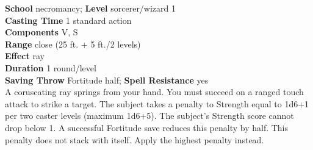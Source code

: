 \textbf{School} necromancy; \textbf{Level} sorcerer/wizard 1\\
\textbf{Casting Time} 1 standard action\\
\textbf{Components} V, S\\
\textbf{Range} close (25 ft. + 5 ft./2 levels)\\
\textbf{Effect} ray\\
\textbf{Duration} 1 round/level\\
\textbf{Saving Throw} Fortitude half; \textbf{Spell Resistance} yes\\
A coruscating ray springs from your hand. You must succeed on a ranged touch attack to strike a target. The subject takes a penalty to Strength equal to 1d6+1 per two caster levels (maximum 1d6+5). The subject's Strength score cannot drop below 1. A successful Fortitude save reduces this penalty by half. This penalty does not stack with itself. Apply the highest penalty instead.\\
